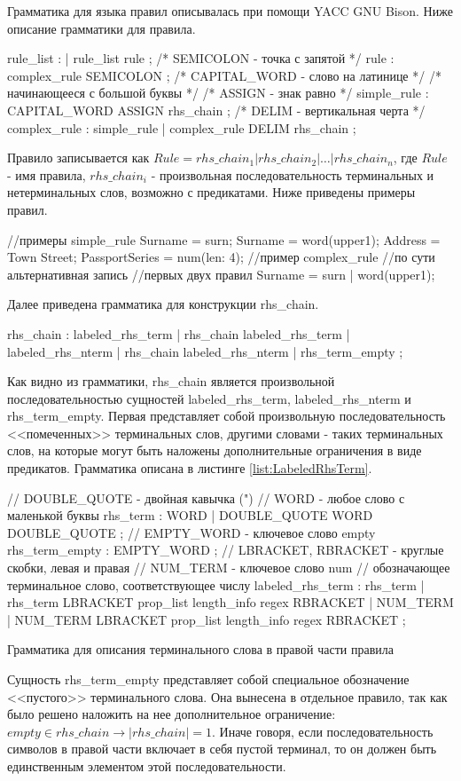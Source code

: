 Грамматика для языка правил описывалась при помощи YACC GNU Bison. Ниже описание грамматики для правила.
\begin{Verb}
rule_list
    : %
    | rule_list rule
    ;
/* SEMICOLON - точка с запятой */
rule 
    : complex_rule SEMICOLON
    ;
/* CAPITAL_WORD - слово на латинице */
/* начинающееся с большой буквы */
/* ASSIGN - знак равно */
simple_rule
    : CAPITAL_WORD ASSIGN rhs_chain
    ;
/* DELIM - вертикальная черта */
complex_rule
    : simple_rule
    | complex_rule DELIM rhs_chain
    ;
\end{Verb}
Правило записывается как $Rule = rhs\_chain_1 | rhs\_chain_2 | \dots | rhs\_chain_n$, где $Rule$ - имя правила, $rhs\_chain_i$ - произвольная последовательность терминальных и нетерминальных слов, возможно с предикатами. Ниже приведены примеры правил.
\begin{Verb}
//примеры simple_rule
Surname = surn;
Surname = word(upper1);
Address = Town Street;
PassportSeries = num(len: 4);
//пример complex_rule
//по сути альтернативная запись
//первых двух правил
Surname = surn | word(upper1);
\end{Verb}
Далее приведена грамматика для конструкции rhs\_chain.
\begin{Verb}
rhs_chain
    : labeled_rhs_term
    | rhs_chain labeled_rhs_term
    | labeled_rhs_nterm
    | rhs_chain labeled_rhs_nterm
    | rhs_term_empty
    ;
\end{Verb}
Как видно из грамматики, rhs\_chain является произвольной последовательностью сущностей labeled\_rhs\_term, labeled\_rhs\_nterm и rhs\_term\_empty. Первая представляет собой произвольную последовательность <<помеченных>> терминальных слов, другими словами - таких терминальных слов, на которые могут быть наложены дополнительные ограничения в виде предикатов. Грамматика описана в листинге \ref{list:LabeledRhsTerm}.
\begin{ListingEnv}
\begin{Verb}
// DOUBLE_QUOTE - двойная кавычка (")
// WORD - любое слово с маленькой буквы
rhs_term
    : WORD
    | DOUBLE_QUOTE WORD DOUBLE_QUOTE
    ;
// EMPTY_WORD - ключевое слово empty
rhs_term_empty
    : EMPTY_WORD
    ;
// LBRACKET, RBRACKET - круглые скобки, левая и правая
// NUM_TERM - ключевое слово num
// обозначающее терминальное слово, соответствующее числу
labeled_rhs_term
    : rhs_term
    | rhs_term LBRACKET prop_list length_info regex RBRACKET
    | NUM_TERM
    | NUM_TERM LBRACKET prop_list length_info regex RBRACKET
    ;
\end{Verb}
\caption{Грамматика для описания терминального слова в правой части правила}
\label{list:LabeledRhsTerm}
\end{ListingEnv}
Сущность rhs\_term\_empty представляет собой специальное обозначение <<пустого>> терминального слова. Она вынесена в отдельное правило, так как было решено наложить на нее дополнительное ограничение: $empty \in rhs\_chain \rightarrow |rhs\_chain| = 1$. Иначе говоря, если последовательность символов в правой части включает в себя пустой терминал, то он должен быть единственным элементом этой последовательности.


